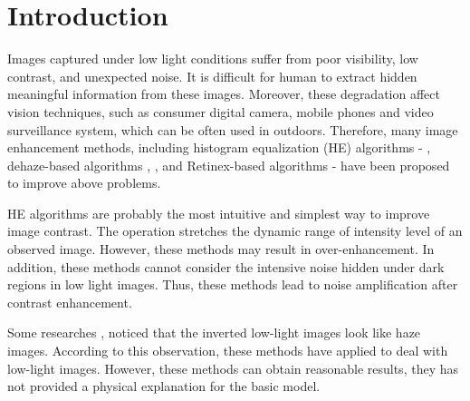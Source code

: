 \chapter{Introduction}
\label{sec:intro}
 Images captured under low light conditions suffer from poor visibility, low contrast, and unexpected noise. 
 It is difficult for human to extract hidden meaningful information from these images.
 Moreover, these degradation affect vision techniques, such as consumer digital camera, mobile phones and video surveillance system, which can be often used in outdoors. 
Therefore, many image enhancement methods, including histogram equalization (HE) algorithms \cite{he1} - \cite{he3}, dehaze-based algorithms \cite{haze1}, \cite{haze2}, and Retinex-based algorithms\cite{ssr} - \cite{rrm} have been proposed to improve above problems. \par

HE algorithms are probably the most intuitive and simplest way to improve image contrast.  The operation stretches the dynamic range of intensity level of an observed image. However, these methods may result in over-enhancement. In addition, these methods cannot consider the intensive noise hidden under dark regions in low light images. Thus, these methods lead to noise amplification after contrast enhancement.\par

Some researches \cite{haze1}, \cite{haze2} noticed that the inverted low-light images look like haze images. 
According to this observation, these methods have applied to deal with low-light images. However, these methods can obtain reasonable results, they has not provided a physical explanation for the basic model.


